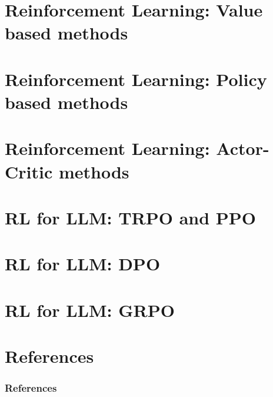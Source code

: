 \documentclass[aspectratio=169]{beamer}
\begin{document}
\section{Reinforcement Learning: Value based methods}


\section{Reinforcement Learning: Policy based methods}


\section{Reinforcement Learning: Actor-Critic methods}


\section{RL for LLM: TRPO and PPO}

\section{RL for LLM: DPO}


\section{RL for LLM: GRPO}


\section{References}


\begin{frame}[allowframebreaks]
    \frametitle{References}
    
    
\end{frame}

\end{document}
